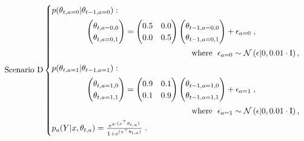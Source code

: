 \begin{equation}
\text{Scenario D}
\begin{cases}
\vspace*{1ex}
p(\theta_{t,a=0}|\theta_{t-1,a=0}): \\ \vspace*{1ex}
\hspace*{10ex}\begin{pmatrix}
\theta_{t,a=0,0}\\
\theta_{t,a=0,1}\\
\end{pmatrix} = \begin{pmatrix}
0.5 & 0.0 \\
0.0 & 0.5 \\
\end{pmatrix} \begin{pmatrix}
\theta_{t-1,a=0,0}\\
\theta_{t-1,a=0,1}\\
\end{pmatrix} + \epsilon_{a=0}  \;, \\ \vspace*{1ex}
\hspace*{40ex} \text{where } \;  \epsilon_{a=0} \sim \N{\epsilon|0,0.01 \cdot\mathrm{I}},\\

\vspace*{1ex}
p(\theta_{t,a=1}|\theta_{t-1,a=1}): \\ \vspace*{1ex}
\hspace*{10ex}\begin{pmatrix}
\theta_{t,a=1,0}\\
\theta_{t,a=1,1}\\
\end{pmatrix} = \begin{pmatrix}
0.9 & 0.1 \\
0.1 & 0.9 \\
\end{pmatrix} \begin{pmatrix}
\theta_{t-1,a=1,0}\\
\theta_{t-1,a=1,1}\\
\end{pmatrix} + \epsilon_{a=1}  \;, \\ \vspace*{1ex}
\hspace*{40ex} \text{where } \;  \epsilon_{a=1} \sim \N{\epsilon|0,0.01 \cdot\mathrm{I}}, \\

p_a(Y|x,\theta_{t,a})=\frac{e^{y\cdot(x^\top\theta_{t,a}) }}{1+e^{(x^\top\theta_{t,a})}} \; .
\end{cases}
\label{eq:linear_mixing_dynamics_d}
\end{equation}

